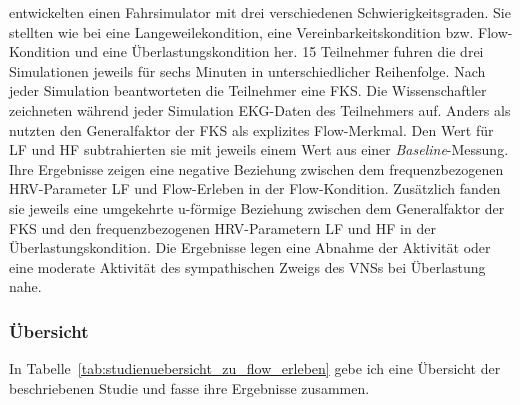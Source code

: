 \citet{Tozman2015} entwickelten einen Fahrsimulator mit drei verschiedenen Schwierigkeitsgraden. Sie stellten wie bei \citet{Keller2011} eine Langeweilekondition, eine Vereinbarkeitskondition bzw. Flow-Kondition und eine Überlastungskondition her. 15 Teilnehmer fuhren die drei Simulationen jeweils für sechs Minuten in unterschiedlicher Reihenfolge. Nach jeder Simulation beantworteten die Teilnehmer eine \ac{FKS}. Die Wissenschaftler zeichneten während jeder Simulation \ac{EKG}-Daten des Teilnehmers auf. Anders als \citet{Peifer2014} nutzten \citet{Tozman2015} den Generalfaktor der \ac{FKS} als explizites Flow-Merkmal. Den Wert für \ac{LF} und \ac{HF} subtrahierten sie mit jeweils einem Wert aus einer \emph{Baseline}-Messung. Ihre Ergebnisse zeigen eine negative Beziehung zwischen dem frequenzbezogenen \ac{HRV}-Parameter \ac{LF} und Flow-Erleben in der Flow-Kondition. Zusätzlich fanden sie jeweils eine umgekehrte u-förmige Beziehung zwischen dem Generalfaktor der \ac{FKS} und den frequenzbezogenen \ac{HRV}-Parametern \ac{LF} und \ac{HF} in der Überlastungskondition. Die Ergebnisse legen eine Abnahme der Aktivität oder eine moderate Aktivität des sympathischen Zweigs des \ac{VNS}s bei Überlastung nahe.

\subsubsection{Übersicht}
In Tabelle~\ref{tab:studienuebersicht_zu_flow_erleben} gebe ich eine Übersicht der beschriebenen Studie und fasse ihre Ergebnisse zusammen.

